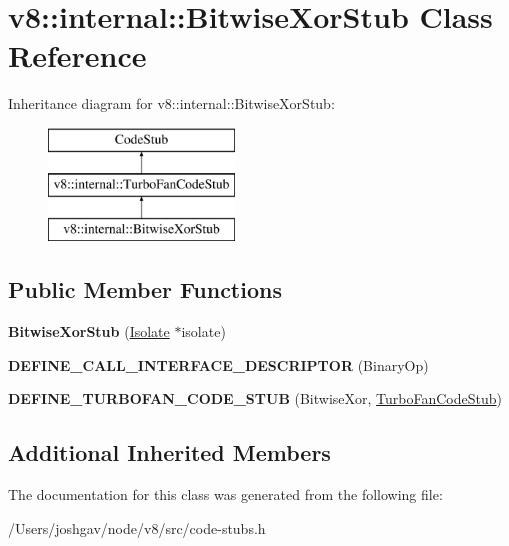 \hypertarget{classv8_1_1internal_1_1_bitwise_xor_stub}{}\section{v8\+:\+:internal\+:\+:Bitwise\+Xor\+Stub Class Reference}
\label{classv8_1_1internal_1_1_bitwise_xor_stub}
Inheritance diagram for v8\+:\+:internal\+:\+:Bitwise\+Xor\+Stub\+:\begin{figure}[H]
\begin{center}
\leavevmode
\includegraphics[height=3.000000cm]{classv8_1_1internal_1_1_bitwise_xor_stub}
\end{center}
\end{figure}
\subsection*{Public Member Functions}
\begin{DoxyCompactItemize}
\item 
{\bfseries Bitwise\+Xor\+Stub} (\hyperlink{classv8_1_1internal_1_1_isolate}{Isolate} $\ast$isolate)\hypertarget{classv8_1_1internal_1_1_bitwise_xor_stub_af1874714af5b61c74f4cf02b3b5bfa59}{}\label{classv8_1_1internal_1_1_bitwise_xor_stub_af1874714af5b61c74f4cf02b3b5bfa59}

\item 
{\bfseries D\+E\+F\+I\+N\+E\+\_\+\+C\+A\+L\+L\+\_\+\+I\+N\+T\+E\+R\+F\+A\+C\+E\+\_\+\+D\+E\+S\+C\+R\+I\+P\+T\+OR} (Binary\+Op)\hypertarget{classv8_1_1internal_1_1_bitwise_xor_stub_a27d560dbd95ac1255e6eedbc497206cb}{}\label{classv8_1_1internal_1_1_bitwise_xor_stub_a27d560dbd95ac1255e6eedbc497206cb}

\item 
{\bfseries D\+E\+F\+I\+N\+E\+\_\+\+T\+U\+R\+B\+O\+F\+A\+N\+\_\+\+C\+O\+D\+E\+\_\+\+S\+T\+UB} (Bitwise\+Xor, \hyperlink{classv8_1_1internal_1_1_turbo_fan_code_stub}{Turbo\+Fan\+Code\+Stub})\hypertarget{classv8_1_1internal_1_1_bitwise_xor_stub_ab350d0f49e2a005fdb0b9be782fa3c79}{}\label{classv8_1_1internal_1_1_bitwise_xor_stub_ab350d0f49e2a005fdb0b9be782fa3c79}

\end{DoxyCompactItemize}
\subsection*{Additional Inherited Members}


The documentation for this class was generated from the following file\+:\begin{DoxyCompactItemize}
\item 
/\+Users/joshgav/node/v8/src/code-\/stubs.\+h\end{DoxyCompactItemize}
